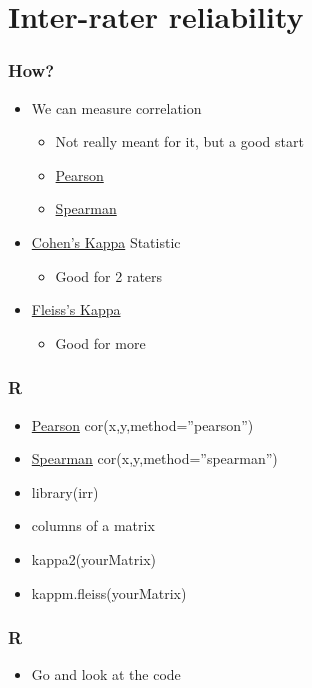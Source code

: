 \documentclass[bigger]{beamer}
\begin{document}
\section{Inter-rater reliability}
\label{sec-2}
\begin{frame}
\frametitle{How?}
\label{sec-2-1}


\begin{itemize}
\item We can measure correlation
\begin{itemize}
\item Not really meant for it, but a good start
\item \href{http://en.wikipedia.org/wiki/Pearson_product-moment_correlation_coefficient}{Pearson}
\item \href{http://en.wikipedia.org/wiki/Spearman%27s_rank_correlation_coefficient}{Spearman}
\end{itemize}
\item \href{http://en.wikipedia.org/wiki/Cohen%27s_kappa}{Cohen's Kappa} Statistic
\begin{itemize}
\item Good for 2 raters
\end{itemize}
\item \href{http://en.wikipedia.org/wiki/Fleiss%27_kappa}{Fleiss's Kappa}
\begin{itemize}
\item Good for more
\end{itemize}
\end{itemize}
\end{frame}
\begin{frame}
\frametitle{R}
\label{sec-2-2}


\begin{itemize}
\item \href{http://en.wikipedia.org/wiki/Pearson_product-moment_correlation_coefficient}{Pearson}  cor(x,y,method=''pearson'')
\item \href{http://en.wikipedia.org/wiki/Spearman%27s_rank_correlation_coefficient}{Spearman} cor(x,y,method=''spearman'')
\item library(irr)
\item columns of a matrix
\item kappa2(yourMatrix)
\item kappm.fleiss(yourMatrix)
\end{itemize}
\end{frame}
\begin{frame}
\frametitle{R}
\label{sec-2-3}


\begin{itemize}
\item Go and look at the code
\end{itemize}
\end{frame}
\end{document}
